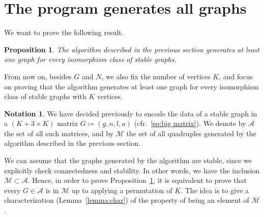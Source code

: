 \documentclass{amsart}
\theoremstyle{plain}
\newtheorem{proposition}[theorem]{Proposition}
\theoremstyle{definition}
\newtheorem{notation}[theorem]{Notation}
\newcommand{\ubar}[1]{\underline{#1}}
\begin{document}
\section{The program generates all graphs}\label{sec:proof}

We want to prove the following result.

\begin{proposition}\label{prop:main}
  The algorithm described in the previous section generates at least
  one graph for every isomorphism class of stable graphs.
\end{proposition}

From now on, besides $G$ and $N$, we also fix the number of vertices
$K$, and focus on proving that the algorithm generates at least one
graph for every isomorphism class of stable graphs with $K$ vertices.


\begin{notation}
  We have decided previously to encode the data of a stable graph in a
  $(K+3 \times K)$ matrix $G \coloneqq (g, n, l, a)$ (cfr.~\ref{eq:big
    matrix}). We denote by $\mathcal{A}$ the set of all such matrices,
  and by $\mathcal{M}$ the set of all quadruples generated by the
  algorithm described in the previous section.
\end{notation}

We can assume that the graphs generated by the algorithm are stable,
since we explicitly check connectedness and stability. In other words,
we have the inclusion $\mathcal{M} \subset \mathcal{A}$. Hence, in
order to prove Proposition~\ref{prop:main}, it is equivalent to prove
that every $G \in \mathcal{A}$ is in $\mathcal{M}$ up to applying a
permutation of $\ubar{K}$. The idea is to give a characterization
(Lemma~\ref{lemma:char}) of the property of being an element of
$\mathcal{M}$.
\end{document}
